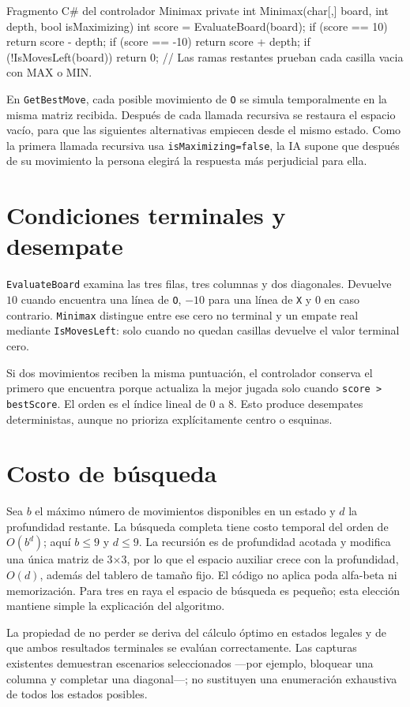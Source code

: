 \begin{codigobox}{Fragmento C\# del controlador Minimax}
private int Minimax(char[,] board, int depth, bool isMaximizing)
{
    int score = EvaluateBoard(board);
    if (score == 10) return score - depth;
    if (score == -10) return score + depth;
    if (!IsMovesLeft(board)) return 0;
    // Las ramas restantes prueban cada casilla vacia con MAX o MIN.
}
\end{codigobox}

En \texttt{GetBestMove}, cada posible movimiento de \texttt{O} se simula temporalmente en la misma matriz recibida. Después de cada llamada recursiva se restaura el espacio vacío, para que las siguientes alternativas empiecen desde el mismo estado. Como la primera llamada recursiva usa \texttt{isMaximizing=false}, la IA supone que después de su movimiento la persona elegirá la respuesta más perjudicial para ella.

\section{Condiciones terminales y desempate}
\texttt{EvaluateBoard} examina las tres filas, tres columnas y dos diagonales. Devuelve $10$ cuando encuentra una línea de \texttt{O}, $-10$ para una línea de \texttt{X} y $0$ en caso contrario. \texttt{Minimax} distingue entre ese cero no terminal y un empate real mediante \texttt{IsMovesLeft}: solo cuando no quedan casillas devuelve el valor terminal cero.

Si dos movimientos reciben la misma puntuación, el controlador conserva el primero que encuentra porque actualiza la mejor jugada solo cuando \texttt{score > bestScore}. El orden es el índice lineal de 0 a 8. Esto produce desempates deterministas, aunque no prioriza explícitamente centro o esquinas.

\section{Costo de búsqueda}
Sea $b$ el máximo número de movimientos disponibles en un estado y $d$ la profundidad restante. La búsqueda completa tiene costo temporal del orden de $O(b^d)$; aquí $b\leq9$ y $d\leq9$. La recursión es de profundidad acotada y modifica una única matriz de 3$\times$3, por lo que el espacio auxiliar crece con la profundidad, $O(d)$, además del tablero de tamaño fijo. El código no aplica poda alfa-beta ni memorización. Para tres en raya el espacio de búsqueda es pequeño; esta elección mantiene simple la explicación del algoritmo.

La propiedad de no perder se deriva del cálculo óptimo en estados legales y de que ambos resultados terminales se evalúan correctamente. Las capturas existentes demuestran escenarios seleccionados —por ejemplo, bloquear una columna y completar una diagonal—; no sustituyen una enumeración exhaustiva de todos los estados posibles.

